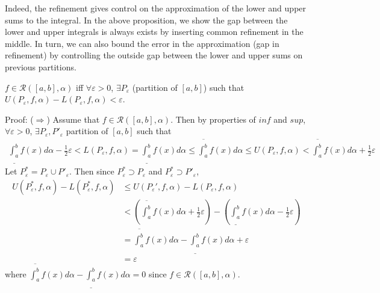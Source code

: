 \documentclass{tufte-handout}
\begin{document}
\hfill\qedsymbol

Indeed, the refinement gives control on the approximation of the lower and upper sums to the integral.
In the above proposition, we show the gap between the lower and upper integrals is always exists by inserting common refinement
in the middle.
In turn, 
we can also bound the error in the approximation (gap in refinement) 
by controlling the outside gap between the lower and upper sums on previous partitions.

\begin{Proposition}
    \( f \in \mathcal{R}([a,b], \alpha) \) iff \( 
    \forall \varepsilon>0 \), \(\exists P_\varepsilon\) (partition of 
    \([a,b]\)) such that \( U(P_\varepsilon, f, \alpha) - L(P_\varepsilon, f, \alpha) < \varepsilon \).
\end{Proposition}
Proof: (\(\Rightarrow\)) Assume that \( f \in \mathcal{R}([a,b], \alpha) \).
Then by properties of \( inf \) and \( sup \), \(\forall \varepsilon>0\), 
\(\exists P_\varepsilon, P'_\varepsilon\) partition 
of \([a,b]\) such that
\begin{align}
    \underline{\int_{a}^b} f(x)d\alpha  - \frac12\varepsilon < L(P_\varepsilon, f, \alpha) 
    = \underline{\int_{a}^b} f(x)d\alpha \leq \overline{\int_{a}^b} f(x)d\alpha
    \leq U(P_\varepsilon, f, \alpha) < \overline{\int_{a}^b} f(x)d\alpha + \frac12\varepsilon
\end{align}
Let \( P_\varepsilon^* = P_\varepsilon \cup P'_\varepsilon \).
Then since \( P_\varepsilon^* \supset P_\varepsilon \) 
and \( P_\varepsilon^* \supset P'_\varepsilon \),
\begin{align}
    U(P_\varepsilon^*, f, \alpha) - L(P_\varepsilon^*, f, \alpha)
    &\leq U(P_\varepsilon', f, \alpha) - L(P_\varepsilon, f, \alpha)\\
    &< (\overline{\int_{a}^b} f(x) d\alpha + \frac{1}{2}\varepsilon) - (\underline{\int_{a}^b} f(x)d\alpha - \frac{1}{2}\varepsilon)\\
    &= \overline{\int_{a}^b} f(x) d\alpha - \underline{\int_{a}^b} f(x)d\alpha + \varepsilon\\
    &= \varepsilon
\end{align}
where \( 
\overline{\int_{a}^b} f(x) d\alpha - \underline{\int_{a}^b} f(x)d\alpha =0
 \)
since \( f \in \mathcal{R}([a,b], \alpha) \).
\end{document}
